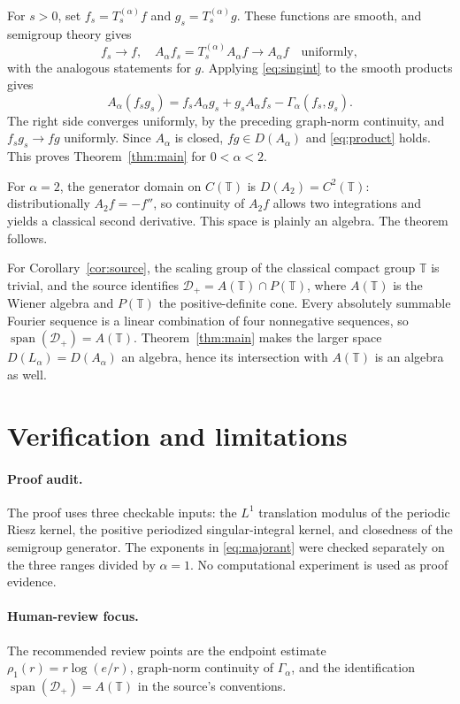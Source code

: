 \documentclass[11pt]{article}
\theoremstyle{remark}
\newcommand{\T}{\mathbb T}
\newcommand{\D}{\mathcal D}
\begin{document}
For $s>0$, set $f_s=T_s^{(\alpha)}f$ and
$g_s=T_s^{(\alpha)}g$. These functions are smooth, and semigroup theory gives
\[
 f_s\to f,\quad A_\alpha f_s=T_s^{(\alpha)}A_\alpha f\to A_\alpha f
 \quad\text{uniformly},
\]
with the analogous statements for $g$. Applying
\eqref{eq:singint} to the smooth products gives
\[
 A_\alpha(f_sg_s)
 =f_sA_\alpha g_s+g_sA_\alpha f_s-\Gamma_\alpha(f_s,g_s).
\]
The right side converges uniformly, by the preceding graph-norm continuity,
and $f_sg_s\to fg$ uniformly. Since $A_\alpha$ is closed, $fg\in
D(A_\alpha)$ and \eqref{eq:product} holds. This proves
Theorem~\ref{thm:main} for $0<\alpha<2$.

For $\alpha=2$, the generator domain on $C(\T)$ is
$D(A_2)=C^2(\T)$: distributionally $A_2f=-f''$, so continuity of $A_2f$
allows two integrations and yields a classical second derivative. This space
is plainly an algebra. The theorem follows.

For Corollary~\ref{cor:source}, the scaling group of the classical compact
group $\T$ is trivial, and the source identifies
$\D_+=A(\T)\cap P(\T)$, where $A(\T)$ is the Wiener algebra and $P(\T)$ the
positive-definite cone. Every absolutely summable Fourier sequence is a
linear combination of four nonnegative sequences, so
$\operatorname{span}(\D_+)=A(\T)$. Theorem~\ref{thm:main} makes the larger
space $D(L_\alpha)=D(A_\alpha)$ an algebra, hence its intersection with
$A(\T)$ is an algebra as well.

\section{Verification and limitations}

\paragraph{Proof audit.}
The proof uses three checkable inputs: the $L^1$ translation modulus of the
periodic Riesz kernel, the positive periodized singular-integral kernel, and
closedness of the semigroup generator. The exponents in
\eqref{eq:majorant} were checked separately on the three ranges divided by
$\alpha=1$. No computational experiment is used as proof evidence.

\paragraph{Human-review focus.}
The recommended review points are the endpoint estimate
$\rho_1(r)=r\log(e/r)$, graph-norm continuity of $\Gamma_\alpha$, and the
identification $\operatorname{span}(\D_+)=A(\T)$ in the source's conventions.
\end{document}
